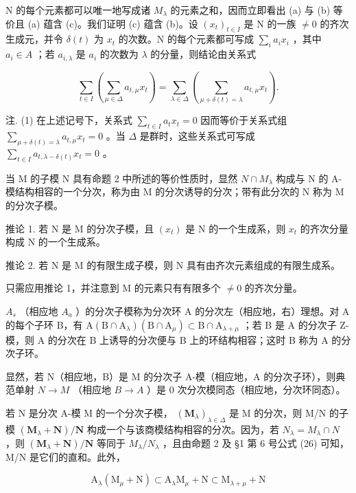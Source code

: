 N 的每个元素都可以唯一地写成诸 \(M_{\lambda}\) 的元素之和，因而立即看出 (a) 与 (b) 等价且 (a) 蕴含 (c)。我们证明 (c) 蕴含 (b)。设 \((x_{t})_{t\in I}\) 是 N 的一族 \(\neq0\) 的齐次生成元，并令 \(\delta(t)\) 为 \(x_{t}\) 的次数。N 的每个元素都可写成 \(\sum_{i}a_{i}x_{i}\) ，其中 \(a_{i}\in A\) ；若 \(a_{i,\lambda}\) 是 \(a_{i}\) 的次数为 \(\lambda\) 的分量，则结论由关系式

\[
\sum_ {t \in I} \left(\sum_ {\mu \in \Delta} a _ {t, \mu} x _ {t}\right) = \sum_ {\lambda \in \Delta} \left(\sum_ {\mu + \delta (t) = \lambda} a _ {t, \mu} x _ {t}\right).
\]

注. (1) 在上述记号下，关系式 \(\sum_{t\in I}a_t x_t = 0\) 因而等价于关系式组 \(\sum_{\mu +\delta (t) = \lambda}a_{t,\mu}x_{t} = 0\) 。当 \(\Delta\) 是群时，这些关系式可写成 \(\sum_{t\in I}a_{t,\lambda -\delta (t)}x_{t} = 0\) 。

当 M 的子模 N 具有命题 2 中所述的等价性质时，显然 \(N \cap M_{\lambda}\) 构成与 N 的 A-模结构相容的一个分次，称为由 M 的分次诱导的分次；带有此分次的 N 称为 M 的分次子模。

推论 1. 若 N 是 M 的分次子模，且 \((x_{t})\) 是 N 的一个生成系，则 \(x_{t}\) 的齐次分量构成 N 的一个生成系。

推论 2. 若 N 是 M 的有限生成子模，则 N 具有由齐次元素组成的有限生成系。

只需应用推论 1，并注意到 M 的元素只有有限多个 \(\neq0\) 的齐次分量。

\(A_{s}\) （相应地 \(A_{a}\) ）的分次子模称为分次环 A 的分次左（相应地，右）理想。对 A 的每个子环 B，有 \(\mathrm{A}(\mathrm{B} \cap \mathrm{A}_{\lambda})(\mathrm{B} \cap \mathrm{A}_{\mu}) \subset \mathrm{B} \cap \mathrm{A}_{\lambda + \mu}\) ；若 B 是 A 的分次子 Z-模，则 A 的分次在 B 上诱导的分次便与 B 上的环结构相容；这时 B 称为 A 的分次子环。

显然，若 N（相应地，B）是 M 的分次子 A-模（相应地，A 的分次子环），则典范单射 \(N \rightarrow M\) （相应地 \(B \rightarrow A\) ）是 0 次分次模同态（相应地，分次环同态）。

若 N 是分次 A-模 M 的一个分次子模， \((\mathbf{M}_{\lambda})_{\lambda\in\Delta}\) 是 M 的分次，则 M/N 的子模 \((\mathbf{M}_{\lambda}+\mathbf{N})/\mathbf{N}\) 构成一个与该商模结构相容的分次。因为，若 \(N_{\lambda}=M_{\lambda}\cap N\) ，则 \((\mathbf{M}_{\lambda}+\mathbf{N})/\mathbf{N}\) 等同于 \(M_{\lambda}/N_{\lambda}\) ，且由命题 2 及 §1 第 6 号公式 (26) 可知，M/N 是它们的直和。此外，

\[
\mathrm{A} _ {\lambda} (\mathrm{M} _ {\mu} + \mathrm{N}) \subset \mathrm{A} _ {\lambda} \mathrm{M} _ {\mu} + \mathrm{N} \subset \mathrm{M} _ {\lambda + \mu} + \mathrm{N}
\]

